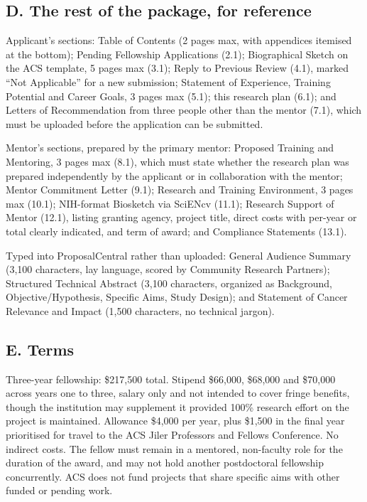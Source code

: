 \documentclass[12pt,letterpaper]{article}
\begin{document}
\subsection*{D. The rest of the package, for reference}

Applicant's sections: Table of Contents (2 pages max, with appendices itemised
at the bottom); Pending Fellowship Applications (2.1); Biographical Sketch on
the ACS template, 5 pages max (3.1); Reply to Previous Review (4.1), marked
``Not Applicable'' for a new submission; Statement of Experience, Training
Potential and Career Goals, 3 pages max (5.1); this research plan (6.1); and
Letters of Recommendation from three people other than the mentor (7.1), which
must be uploaded before the application can be submitted.

Mentor's sections, prepared by the primary mentor: Proposed Training and
Mentoring, 3 pages max (8.1), which must state whether the research plan was
prepared independently by the applicant or in collaboration with the mentor;
Mentor Commitment Letter (9.1); Research and Training Environment, 3 pages max
(10.1); NIH-format Biosketch via SciENcv (11.1); Research Support of Mentor
(12.1), listing granting agency, project title, direct costs with per-year or
total clearly indicated, and term of award; and Compliance Statements (13.1).

Typed into ProposalCentral rather than uploaded: General Audience Summary
(3,100 characters, lay language, scored by Community Research Partners);
Structured Technical Abstract (3,100 characters, organized as Background,
Objective/Hypothesis, Specific Aims, Study Design); and Statement of Cancer
Relevance and Impact (1,500 characters, no technical jargon).

\subsection*{E. Terms}

Three-year fellowship: \$217,500 total. Stipend \$66,000, \$68,000 and \$70,000
across years one to three, salary only and not intended to cover fringe
benefits, though the institution may supplement it provided 100\% research
effort on the project is maintained. Allowance \$4,000 per year, plus \$1,500
in the final year prioritised for travel to the ACS Jiler Professors and
Fellows Conference. No indirect costs. The fellow must remain in a mentored,
non-faculty role for the duration of the award, and may not hold another
postdoctoral fellowship concurrently. ACS does not fund projects that share
specific aims with other funded or pending work.
\end{document}
